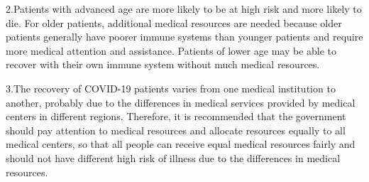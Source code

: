 \documentclass[
  journal=medium,
  manuscript=Report,
  year=2023,
  volume=37,
]{cup-journal}
\begin{document}
2.Patients with advanced age are more likely to be at high risk and more likely to die. For older patients, additional medical resources are needed because older patients generally have poorer immune systems than younger patients and require more medical attention and assistance. Patients of lower age may be able to recover with their own immune system without much medical resources.

3.The recovery of COVID-19 patients varies from one medical institution to another, probably due to the differences in medical services provided by medical centers in different regions. Therefore, it is recommended that the government should pay attention to medical resources and allocate resources equally to all medical centers, so that all people can receive equal medical resources fairly and should not have different high risk of illness due to the differences in medical resources.
\end{document}
